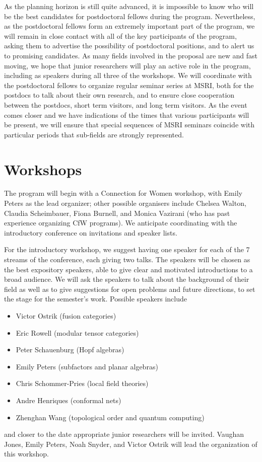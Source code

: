 \documentclass[12pt]{article}
\begin{document}
As the planning horizon is still quite advanced, it is impossible to know who will be the best candidates for postdoctoral fellows during the program. Nevertheless, as the postdoctoral fellows form an extremely important part of the program, we will remain in close contact with all of the key participants of the program, asking them to advertise the possibility of postdoctoral positions, and to alert us to promising candidates. As many fields involved in the proposal are new and fast moving, we hope that junior researchers will play an active role in the program, including as speakers during all three of the workshops. We will coordinate with the postdoctoral fellows to organize regular seminar series at MSRI, both for the postdocs to talk about their own research, and to ensure close cooperation between the postdocs, short term visitors, and long term visitors. As the event comes closer and we have indications of the times that various participants will be present, we will ensure that special sequences of MSRI seminars coincide with particular periods that sub-fields are strongly represented. 

\section{Workshops}
The program will begin with a Connection for Women workshop, with Emily Peters as the lead organizer; other possible organisers include Chelsea Walton, Claudia Scheimbauer, Fiona Burnell, and Monica Vazirani (who has past experience organizing CfW programs). We anticipate coordinating with the introductory conference on invitations and speaker lists. 

For the introductory workshop, we suggest having one speaker for each of the 7 streams of the conference, each giving two talks.
The speakers will be chosen as the best expository speakers, able to give clear and motivated introductions to a broad audience. We will ask the speakers to talk about the background of their field as well as to give suggestions for open problems and future directions, to set the stage for the semester's work. Possible speakers include
\begin{itemize}
  \setlength{\itemsep}{1pt}
  \setlength{\parskip}{0pt}
  \setlength{\parsep}{0pt}
\item Victor Ostrik (fusion categories) 
\item Eric Rowell (modular tensor categories)
\item Peter Schauenburg (Hopf algebras)
\item Emily Peters (subfactors and planar algebras) %
\item Chris Schommer-Pries (local field theories) %
\item Andre Henriques (conformal nets) %
\item Zhenghan Wang (topological order and quantum computing) %
\end{itemize}
and closer to the date appropriate junior researchers will be invited. Vaughan Jones, Emily Peters, Noah Snyder, and Victor Ostrik will lead the organization of this workshop.
\end{document}

